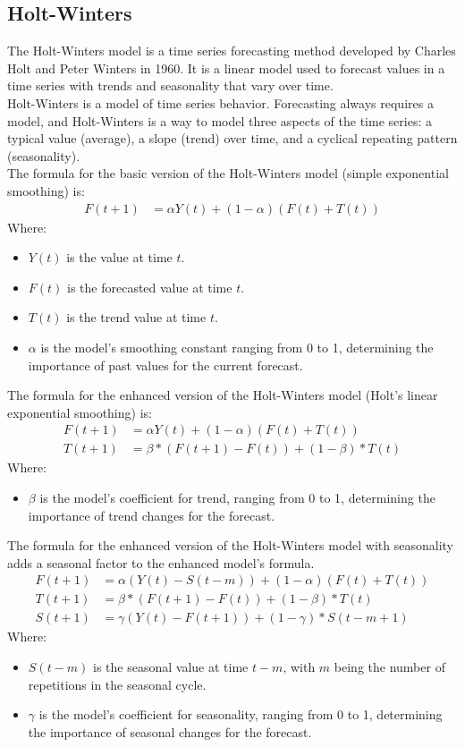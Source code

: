 \documentclass{ieeeojies}
\begin{document}
	\subsection{Holt-Winters}
	The Holt-Winters model is a time series forecasting method developed by Charles Holt and Peter Winters in 1960. It is a linear model used to forecast values in a time series with trends and seasonality that vary over time.\\
	Holt-Winters is a model of time series behavior. Forecasting always requires a model, and Holt-Winters is a way to model three aspects of the time series: a typical value (average), a slope (trend) over time, and a cyclical repeating pattern (seasonality). \cite{b9}\\
	The formula for the basic version of the Holt-Winters model (simple exponential smoothing) is:
	\begin{align*}
		F(t+1) &= \alpha Y(t) + (1-\alpha)(F(t) + T(t))
	\end{align*}
	Where:
	\begin{itemize}
		\item \( Y(t) \) is the value at time \( t \).
		\item \( F(t) \) is the forecasted value at time \( t \).
		\item \( T(t) \) is the trend value at time \( t \).
		\item \( \alpha \) is the model's smoothing constant ranging from 0 to 1, determining the importance of past values for the current forecast.
	\end{itemize}
	
	The formula for the enhanced version of the Holt-Winters model (Holt's linear exponential smoothing) is:
	\begin{align*}
		F(t+1) &= \alpha Y(t) + (1-\alpha)(F(t) + T(t)) \\
		T(t+1) &= \beta*(F(t+1)-F(t)) + (1-\beta)*T(t)
	\end{align*}
	Where:
	\begin{itemize}
		\item \( \beta \) is the model's coefficient for trend, ranging from 0 to 1, determining the importance of trend changes for the forecast.
	\end{itemize}
	The formula for the enhanced version of the Holt-Winters model with seasonality adds a seasonal factor to the enhanced model's formula.
	\begin{align*}
		F(t+1) &= \alpha(Y(t) - S(t-m)) + (1-\alpha)(F(t) + T(t)) \\
		T(t+1) &= \beta*(F(t+1)-F(t)) + (1-\beta)*T(t) \\
		S(t+1) &= \gamma(Y(t) - F(t+1)) + (1-\gamma)*S(t-m+1)
	\end{align*}
	Where:
	\begin{itemize}
		\item \( S(t-m) \) is the seasonal value at time \( t-m \), with \( m \) being the number of repetitions in the seasonal cycle.
		\item \( \gamma \) is the model's coefficient for seasonality, ranging from 0 to 1, determining the importance of seasonal changes for the forecast.
	\end{itemize}
	
\end{document}

